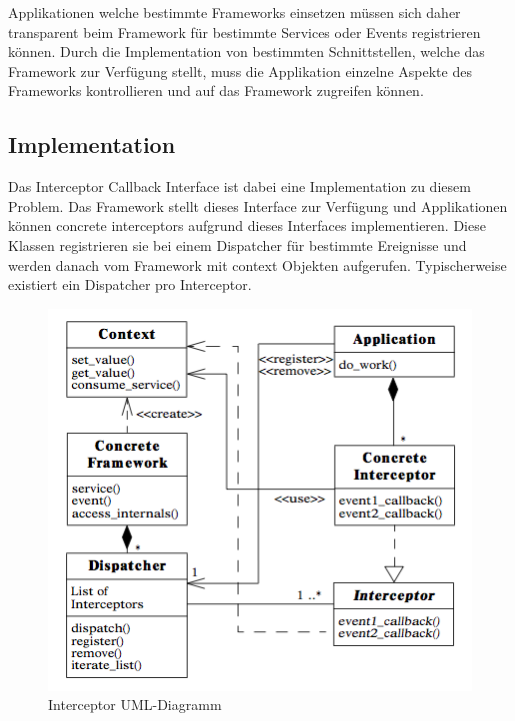 Applikationen welche bestimmte Frameworks einsetzen müssen sich daher transparent beim Framework für bestimmte Services oder Events registrieren können. Durch die Implementation von bestimmten Schnittstellen, welche das Framework zur Verfügung stellt, muss die Applikation einzelne Aspekte des Frameworks kontrollieren und auf das Framework zugreifen können.


\subsection{Implementation}

Das Interceptor Callback Interface ist dabei eine Implementation zu diesem Problem. Das Framework stellt dieses Interface zur Verfügung und Applikationen können concrete interceptors aufgrund dieses Interfaces implementieren. Diese Klassen registrieren sie bei einem Dispatcher für bestimmte Ereignisse und werden danach vom Framework mit context Objekten aufgerufen.
Typischerweise existiert ein Dispatcher pro Interceptor.

\begin{figure}[H]
	\centering
	\includegraphics[width=12cm]{content/posa2/interceptor/images/uml-diagram.png}
	\caption{Interceptor UML-Diagramm}
\end{figure}


